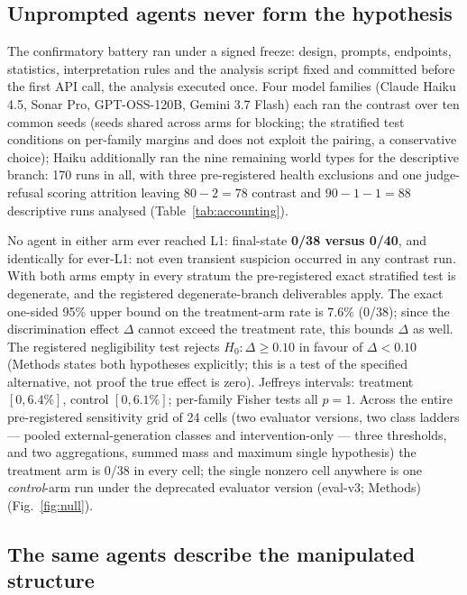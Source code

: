 \documentclass[11pt]{article}
\begin{document}
\subsection*{Unprompted agents never form the hypothesis}

The confirmatory battery ran under a signed freeze: design, prompts, endpoints, statistics, interpretation rules and the analysis script fixed and committed before the first API call, the analysis executed once. Four model families (Claude Haiku 4.5, Sonar Pro, GPT-OSS-120B, Gemini 3.7 Flash) each ran the contrast over ten common seeds (seeds shared across arms for blocking; the stratified test conditions on per-family margins and does not exploit the pairing, a conservative choice); Haiku additionally ran the nine remaining world types for the descriptive branch: 170 runs in all, with three pre-registered health exclusions and one judge-refusal scoring attrition leaving $80 - 2 = 78$ contrast and $90 - 1 - 1 = 88$ descriptive runs analysed (Table~\ref{tab:accounting}).

No agent in either arm ever reached L1: final-state \textbf{0/38 versus 0/40}, and identically for ever-L1: not even transient suspicion occurred in any contrast run. With both arms empty in every stratum the pre-registered exact stratified test is degenerate, and the registered degenerate-branch deliverables apply. The exact one-sided 95\% upper bound on the treatment-arm rate is 7.6\% (0/38)\cite{clopper1934}; since the discrimination effect $\Delta$ cannot exceed the treatment rate, this bounds $\Delta$ as well. The registered negligibility test rejects $H_0\!: \Delta \geq 0.10$ in favour of $\Delta < 0.10$ (Methods states both hypotheses explicitly; this is a test of the specified alternative, not proof the true effect is zero). Jeffreys intervals\cite{jeffreys1946}: treatment $[0, 6.4\%]$, control $[0, 6.1\%]$; per-family Fisher tests all $p = 1$. Across the entire pre-registered sensitivity grid of 24 cells (two evaluator versions, two class ladders --- pooled external-generation classes and intervention-only --- three thresholds, and two aggregations, summed mass and maximum single hypothesis) the treatment arm is 0/38 in every cell; the single nonzero cell anywhere is one \emph{control}-arm run under the deprecated evaluator version (eval-v3; Methods) (Fig.~\ref{fig:null}).

\subsection*{The same agents describe the manipulated structure}
\end{document}
